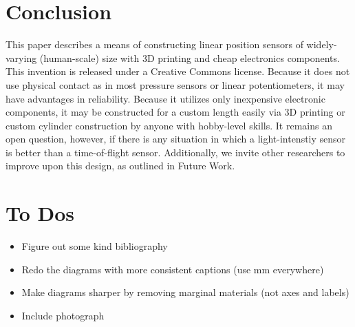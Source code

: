 \documentclass[10pt,conference,compsocconf]{IEEEtran}
\begin{document}
\section{Conclusion}

This paper describes a means of constructing linear position sensors
of widely-varying (human-scale) size with 3D printing and cheap
electronics components. This invention is released under a Creative
Commons license. Because it does not use physical contact as in most
pressure sensors or linear potentiometers, it may have advantages in
reliability. Because it utilizes only inexpensive electronic
components, it may be constructed for a custom length easily via 3D
printing or custom cylinder construction by anyone with hobby-level
skills. It remains an open question, however, if there is any
situation in which a light-intenstiy sensor is better than a time-of-flight sensor.
Additionally, we invite other researchers to improve upon this
design, as outlined in Future Work.


\section{To Dos}

\begin{itemize}
\item Figure out some kind bibliography
\item Redo the diagrams with more consistent captions (use mm everywhere)
\item Make diagrams sharper by removing marginal materials (not axes and labels)
\item Include photograph
\end{itemize}



%
%
\end{document}
